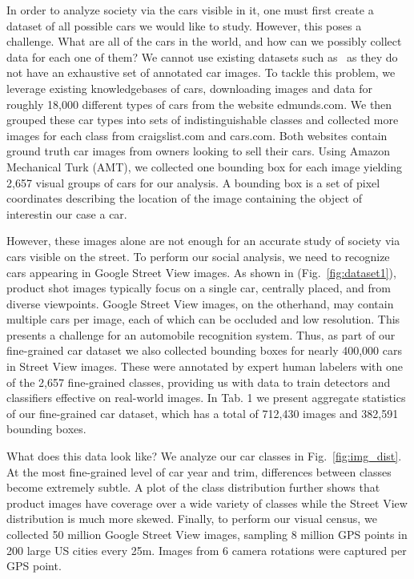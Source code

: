 \documentclass[letterpaper]{article}
\begin{document}
In order to analyze society via the cars visible in it, one must first create a dataset of all possible cars we would like to study. However, this poses a challenge. What are all of the cars in the world, and how can we possibly collect data for each one of them? We cannot use existing datasets such as~\cite{imagenet} as they do not have an exhaustive set of annotated car images.
To tackle this problem, we leverage existing knowledgebases of cars, downloading images and data for roughly 18,000 different types of cars from the website edmunds.com. We then grouped these car types into sets of indistinguishable classes and collected more images for each class from craigslist.com and cars.com. Both websites contain ground truth car images from owners looking to sell their cars.  Using Amazon Mechanical Turk (AMT), we collected one bounding box for each image yielding 2,657 visual groups of cars for our analysis.  A bounding box is a set of pixel coordinates describing the location of the image containing the object of interest\textemdash in our case a car. 

However, these images alone are not enough for an accurate study of society via cars visible on the street. To perform our social analysis, we need to recognize cars appearing in Google Street View images. As shown in (Fig.~\ref{fig:dataset1}), product shot images typically focus on a single car, centrally placed, and from diverse viewpoints. Google Street View images, on the otherhand, may contain multiple cars per image, each of which can be occluded and low resolution. This presents a challenge for an automobile recognition system. Thus, as part of our fine-grained car dataset we also collected bounding boxes for nearly 400,000 cars in Street View images. These were annotated by expert human labelers with one of the 2,657 fine-grained classes, providing us with data to train detectors and classifiers effective on real-world images. In Tab. 1 we present aggregate statistics of our fine-grained car dataset, which has a total of 712,430 images and 382,591 bounding boxes. 

What does this data look like? We analyze our car classes in Fig.~\ref{fig:img_dist}. At the most fine-grained level of car year and trim, differences between classes become extremely subtle. A plot of the class distribution further shows that product images have coverage over a wide variety of classes while the Street View distribution is much more skewed. Finally, to perform our visual census, we collected 50 million Google Street View images, sampling 8 million GPS points in 200 large US cities every 25m. Images from 6 camera rotations were captured per GPS point. 
\end{document}
